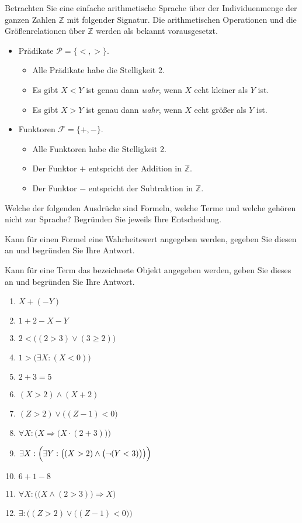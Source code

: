 \documentclass{uebungsblatt}
\begin{document}
\begin{aufgabe}
Betrachten Sie eine einfache arithmetische Sprache
über der Individuenmenge der ganzen Zahlen $\mathbb{Z}$
mit folgender Signatur.
Die arithmetischen Operationen und die Größenrelationen über $\mathbb{Z}$ werden
als bekannt vorausgesetzt.

\begin{itemize}
\item
Prädikate $\mathcal{P} = \{ <, > \}$.
\begin{itemize}
\item Alle Prädikate habe die Stelligkeit 2.
\item Es gibt $X < Y$ ist genau dann \textit{wahr}, wenn $X$ echt kleiner als $Y$ ist.
\item Es gibt $X > Y$ ist genau dann \textit{wahr}, wenn $X$ echt größer als $Y$ ist.
\end{itemize}
\item
Funktoren $\mathcal{F} = \{ +, - \}$.\begin{itemize}
\item Alle Funktoren habe die Stelligkeit 2.
\item Der Funktor $+$ entspricht der Addition in $\mathbb{Z}$.
\item Der Funktor $-$ entspricht der Subtraktion in $\mathbb{Z}$.
\end{itemize}
\end{itemize}

\medskip
Welche der folgenden Ausdrücke sind Formeln, welche Terme und welche gehören nicht 
zur Sprache? Begründen Sie jeweils Ihre Entscheidung.

\medskip
Kann für einen Formel eine Wahrheitswert angegeben werden, gegeben Sie diesen an 
und begründen Sie Ihre Antwort. 

\medskip
Kann für eine Term das bezeichnete Objekt angegeben werden, geben Sie dieses an 
und begründen Sie Ihre Antwort. 

\begin{enumerate} %
\item    
$X + ( -Y)$
\item  
$1+2-X-Y$
\item  
$2 < \bigl( ( 2 > 3) \vee (3 \ge 2) \bigr)$
\item  
$1 > \bigl( \exists X: (X < 0) \bigr)$
\item 
$2 + 3 = 5$
\item 
$(X > 2) \wedge (X + 2)$
\item 
$(Z > 2) \vee \bigl( (Z - 1) < 0 \bigr)$
\item 
$ \forall X: \bigl( X \Rightarrow \bigl( X \cdot (2 + 3) \bigr) \bigr)$
\item 
$\exists X: \Bigl( \exists Y: \bigl( (X > 2) \wedge \bigl( \neg (Y < 3) \bigr) \bigr) \Bigr)$
\item
$6 + 1 - 8$
\item 
$ \forall X: \bigl( \bigl( X \wedge (2 > 3) \bigr) \Rightarrow X \bigr)$
\item 
$\exists : \bigl( (Z > 2) \vee \bigl( (Z - 1) < 0 \bigr) \bigr)$
\end{enumerate}

\end{aufgabe}
\end{document}
